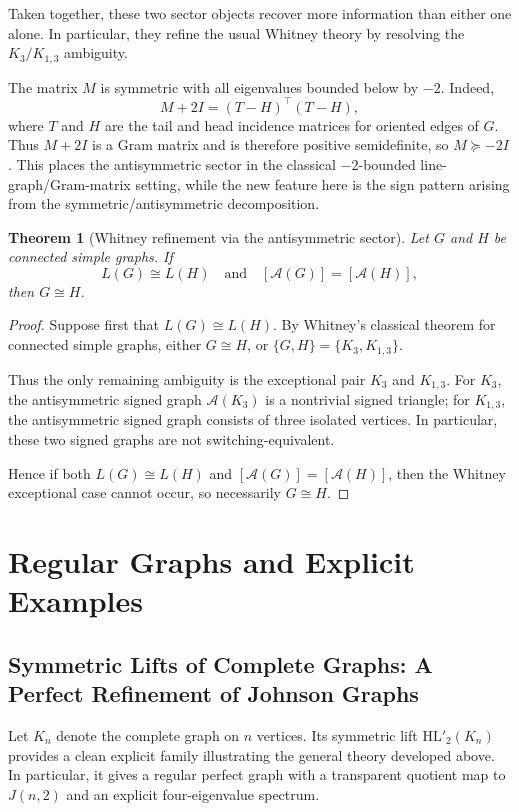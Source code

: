 \documentclass[11pt]{article}
\newtheorem{theorem}{Theorem}
\newcommand{\HL}{\mathrm{HL}}
\theoremstyle{plain}
\begin{document}
Taken together, these two sector objects recover more information than either one alone. In particular, they
refine the usual Whitney theory by resolving the \(K_3/K_{1,3}\) ambiguity.

The matrix \(M\) is symmetric with all eigenvalues bounded below by \(-2\). Indeed,
\[
M+2I=(T-H)^\top(T-H),
\]
where \(T\) and \(H\) are the tail and head incidence matrices for oriented edges of \(G\). Thus \(M+2I\)
is a Gram matrix and is therefore positive semidefinite, so \(M\succeq -2I\).
This places the antisymmetric sector in the classical \(-2\)-bounded line-graph/Gram-matrix setting,
while the new feature here is the sign pattern arising from the symmetric/antisymmetric decomposition.

\begin{theorem}[Whitney refinement via the antisymmetric sector]\label{thm:Whitney-refined}
Let \(G\) and \(H\) be connected simple graphs. If
\[
L(G)\cong L(H)
\quad\text{and}\quad
[\mathcal A(G)]=[\mathcal A(H)],
\]
then \(G\cong H\).
\end{theorem}

\begin{proof}
Suppose first that $L(G)\cong L(H)$. By Whitney's classical theorem for connected simple graphs, either
$G\cong H$, or $\{G,H\}=\{K_3,K_{1,3}\}$.

Thus the only remaining ambiguity is the exceptional pair $K_3$ and $K_{1,3}$.
For $K_3$, the antisymmetric signed graph $\mathcal A(K_3)$ is a nontrivial signed triangle; for
$K_{1,3}$, the antisymmetric signed graph consists of three isolated vertices. In particular,
these two signed graphs are not switching-equivalent.

Hence if both $L(G)\cong L(H)$ and $[\mathcal A(G)]=[\mathcal A(H)]$, then the Whitney exceptional case
cannot occur, so necessarily $G\cong H$.
\end{proof}

\section{Regular Graphs and Explicit Examples}

\subsection{Symmetric Lifts of Complete Graphs: A Perfect Refinement of Johnson Graphs}

Let \(K_n\) denote the complete graph on \(n\) vertices. Its symmetric lift \(\HL'_2(K_n)\)
provides a clean explicit family illustrating the general theory developed above. In particular,
it gives a regular perfect graph with a transparent quotient map to \(J(n,2)\) and an explicit
four-eigenvalue spectrum.
\end{document}
